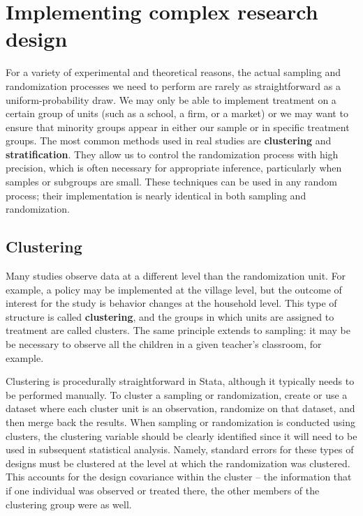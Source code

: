 
\section{Implementing complex research design}

For a variety of experimental and theoretical reasons,
the actual sampling and randomization processes we need to perform
are rarely as straightforward as a uniform-probability draw.
We may only be able to implement treatment on a certain group of units
(such as a school, a firm, or a market)
or we may want to ensure that minority groups appear
in either our sample or in specific treatment groups.
The most common methods used in real studies are \textbf{clustering} and \textbf{stratification}.
They allow us to control the randomization process with high precision,
which is often necessary for appropriate inference,
particularly when samples or subgroups are small.\cite{athey2017econometrics}
These techniques can be used in any random process;
their implementation is nearly identical in both sampling and randomization.

\subsection{Clustering}

Many studies observe data at a different level than the randomization unit.
For example, a policy may be implemented at the village level,
but the outcome of interest for the study is behavior changes at the household level.
This type of structure is called \textbf{clustering},
and the groups in which units are assigned to treatment are called clusters.
The same principle extends to sampling:
it may be be necessary to observe all the children
in a given teacher's classroom, for example.

Clustering is procedurally straightforward in Stata,
although it typically needs to be performed manually.
To cluster a sampling or randomization,
create or use a dataset where each cluster unit is an observation,
randomize on that dataset, and then merge back the results.
When sampling or randomization is conducted using clusters,
the clustering variable should be clearly identified
since it will need to be used in subsequent statistical analysis.
Namely, standard errors for these types of designs must be clustered
at the level at which the randomization was clustered.
This accounts for the design covariance within the cluster --
the information that if one individual was observed or treated there,
the other members of the clustering group were as well.

